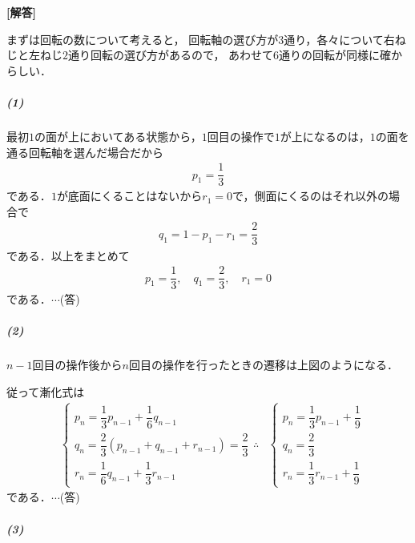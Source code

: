 \documentclass[../../main.tex]{subfiles}
\begin{document}
\begin{oframed}
  
\end{oframed}

{\bf [解答]}


まずは回転の数について考えると，
回転軸の選び方が$3$通り，各々について右ねじと左ねじ$2$通り回転の選び方があるので，
あわせて$6$通りの回転が同様に確からしい．

\subparagraph{(1)}


最初$1$の面が上においてある状態から，$1$回目の操作で$1$が上になるのは，$1$の面を通る回転軸を選んだ場合だから
\begin{align}
  p_1 = \dfrac{1}{3}
\end{align}
である．$1$が底面にくることはないから$r_1=0$で，側面にくるのはそれ以外の場合で
\begin{align}
  q_1 = 1-p_1-r_1 = \dfrac{2}{3}
\end{align}
である．以上をまとめて
\begin{align}
  p_1=\dfrac{1}{3},\quad q_1=\dfrac{2}{3},\quad r_1=0
\end{align}
である．$\cdots$(答)

\subparagraph{(2)}


$n-1$回目の操作後から$n$回目の操作を行ったときの遷移は上図のようになる．

従って漸化式は
\begin{align}
  &
  \begin{cases}
    p_n=\dfrac{1}{3}p_{n-1}+\dfrac{1}{6}q_{n-1} \\
    q_n=\dfrac{2}{3}(p_{n-1}+q_{n-1}+r_{n-1})=\dfrac{2}{3} \\
    r_n=\dfrac{1}{6}q_{n-1}+\dfrac{1}{3}r_{n-1}
  \end{cases}
  \therefore
  &
  \begin{cases}
    p_n=\dfrac{1}{3}p_{n-1}+\dfrac{1}{9} \\
    q_n=\dfrac{2}{3} \\
    r_n=\dfrac{1}{3}r_{n-1}+\dfrac{1}{9}
  \end{cases}
\end{align}
である．$\cdots$(答)

\subparagraph{(3)}
\end{document}
